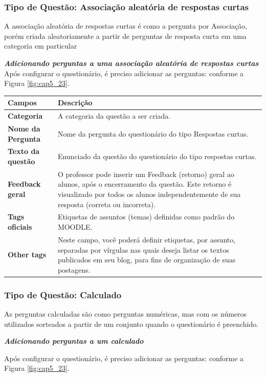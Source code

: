 \subsubsection{Tipo de Questão: Associação aleatória de respostas curtas}
A associação aleatória de respostas curtas é como a pergunta por Associação, porém criada aleatoriamente a partir de perguntas de resposta curta em uma categoria em particular

 \textit{\textbf{Adicionando perguntas a uma associação aleatória de respostas curtas}}
Após configurar o questionário, é preciso adicionar as perguntas: conforme a Figura \ref{fig:cap5_23}.


\begin{longtable}{p{6cm}|p{9cm}}
     \hline
     \rowcolor[rgb]{0.8,0.8,0.8} \textbf{Campos} &  \textbf{Descrição}\\\hline
    \textbf{Categoria} & A categoria da questão a ser criada.  \\\hline
    \textbf{Nome da Pergunta} & Nome da pergunta do questionário do tipo Respostas curtas.  \\\hline
    \textbf{Texto da questão} & Enunciado da questão do questionário do tipo respostas curtas. \\\hline
    \textbf{Feedback geral} & O professor  pode inserir um  Feedback (retorno)  geral  ao alunos,  após o encerramento da questão. Este retorno é visualizado por todos os alunos independentemente de sua resposta (correta ou incorreta). \\\hline
    \textbf{Tags oficiais} &  Etiquetas de assuntos (temas) definidas como padrão do MOODLE. \\\hline
    \textbf{Other tags} &   Neste campo,  você poderá definir  etiquetas,  por assunto, separadas por vírgulas nas quais deseja listar os textos publicados em seu blog, para fins de organização de suas postagens. \\\hline
\end{longtable}%

\subsubsection{Tipo de Questão: Calculado}
As perguntas calculadas são como perguntas numéricas, mas com os números utilizados sorteados a partir de um conjunto quando o questionário é preenchido.

 \textit{\textbf{Adicionando perguntas a um calculado}}

Após configurar o questionário, é preciso adicionar as perguntas: conforme a Figura \ref{fig:cap5_23}.

